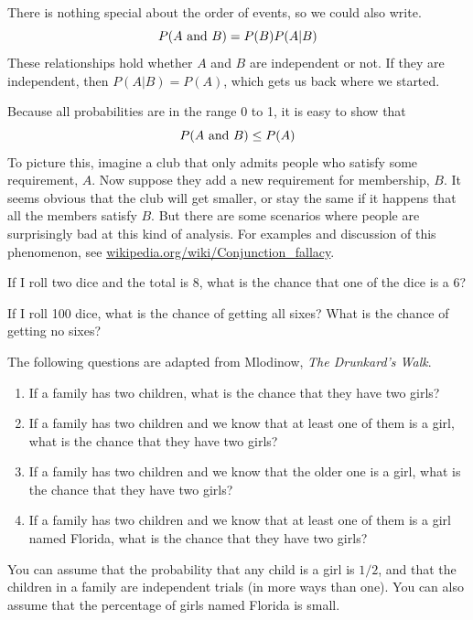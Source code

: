 \documentclass[12pt]{book}
\begin{document}
There is nothing special about the order of events, so we could also
write.
%
\[ P(A ~\mbox{and}~ B) = P(B) P(A|B) \]
%
These relationships hold whether $A$ and $B$ are independent or not.
If they are independent, then $P(A|B) = P(A)$, which gets us back
where we started.

Because all probabilities are in the range 0 to 1, it is
easy to show that 
%
\[ P(A ~\mbox{and}~ B) \le P(A) \]
%
To picture this, imagine a club that only admits people who satisfy
some requirement, $A$.  Now suppose they add a new requirement for
membership, $B$.  It seems obvious that the club will get smaller, or
stay the same if it happens that all the members satisfy $B$.  But
there are some scenarios where people are surprisingly bad at this
kind of analysis.  For examples and discussion of this phenomenon, see
\url{wikipedia.org/wiki/Conjunction_fallacy}.


\begin{ex}
If I roll two dice and the total is 8, what is the chance that
one of the dice is a 6?
\end{ex}

\begin{ex}
If I roll 100 dice, what is the chance of getting all sixes?
What is the chance of getting no sixes?
\end{ex}

\begin{ex}

The following questions are adapted from Mlodinow, {\em The Drunkard's
  Walk}.

\begin{enumerate}

\item If a family has two children, what is the chance that they
  have two girls?

\item If a family has two children and we know that at least one of
  them is a girl, what is the chance that they have two girls?

\item If a family has two children and we know that the older one is a
  girl, what is the chance that they have two girls?

\item If a family has two children and we know that at least one of
  them is a girl named Florida, what is the chance that they have
  two girls?

\end{enumerate}

You can assume that the probability that any child is a girl is $1/2$,
and that the children in a family are independent trials (in more ways
than one).  You can also assume that the percentage of girls named
Florida is small.

\end{ex}
\end{document}
